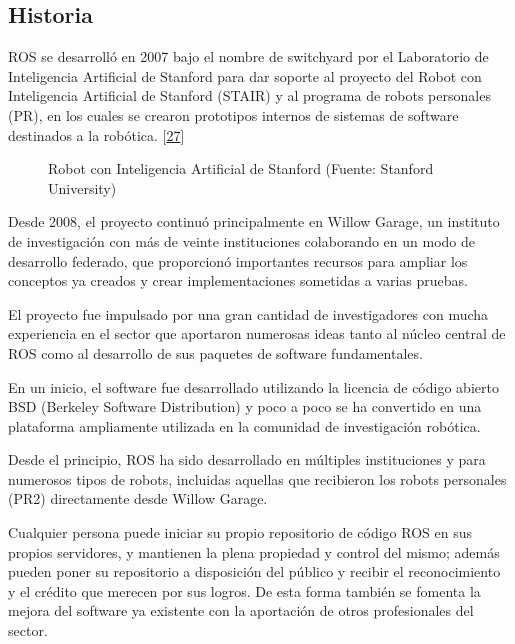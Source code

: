 \documentclass[a4paper,11pt,spanish]{sphinxmanual}
\let\sphinxpxdimen\pdfpxdimen\else\newdimen\sphinxpxdimen
\begin{document}
\subsection{Historia}
\label{\detokenize{marco_teorico_y_estado_del_arte:historia}}
\sphinxAtStartPar
ROS se desarrolló en 2007 bajo el nombre de switchyard por el
Laboratorio de Inteligencia Artificial de Stanford para dar soporte al
proyecto del Robot con Inteligencia Artificial de Stanford (STAIR) y al
programa de robots personales (PR), en los cuales se crearon prototipos
internos de sistemas de software destinados a la robótica. {[}\hyperlink{cite.marco_teorico_y_estado_del_arte:id12}{27}{]}

\begin{figure}[htbp]
\centering
\capstart

\noindent\sphinxincludegraphics[width=150\sphinxpxdimen]{{STAIR}.png}
\caption{Robot con Inteligencia Artificial de Stanford (Fuente: Stanford University)}\label{\detokenize{marco_teorico_y_estado_del_arte:id61}}\end{figure}

\sphinxAtStartPar
Desde 2008, el proyecto continuó principalmente en Willow Garage, un
instituto de investigación con más de veinte instituciones colaborando
en un modo de desarrollo federado, que proporcionó importantes recursos
para ampliar los conceptos ya creados y crear implementaciones sometidas
a varias pruebas.

\sphinxAtStartPar
El proyecto fue impulsado por una gran cantidad de investigadores con
mucha experiencia en el sector que aportaron numerosas ideas tanto al
núcleo central de ROS como al desarrollo de sus paquetes de software
fundamentales.

\sphinxAtStartPar
En un inicio, el software fue desarrollado utilizando la licencia de
código abierto BSD (Berkeley Software Distribution) y poco a poco se ha
convertido en una plataforma ampliamente utilizada en la comunidad de
investigación robótica.

\sphinxAtStartPar
Desde el principio, ROS ha sido desarrollado en múltiples instituciones
y para numerosos tipos de robots, incluidas aquellas que recibieron los
robots personales (PR2) directamente desde Willow Garage.

\sphinxAtStartPar
Cualquier persona puede iniciar su propio repositorio de código ROS en
sus propios servidores, y mantienen la plena propiedad y control del
mismo; además pueden poner su repositorio a disposición del público y
recibir el reconocimiento y el crédito que merecen por sus logros. De
esta forma también se fomenta la mejora del software ya existente con la
aportación de otros profesionales del sector.
\end{document}
